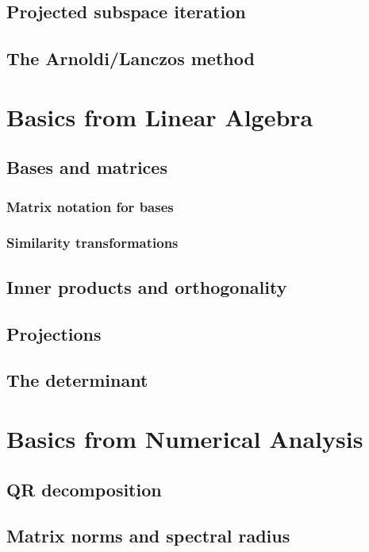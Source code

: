 \section{Projected subspace iteration}


\section{The Arnoldi/Lanczos method}



\appendix
\chapter{Basics from Linear Algebra}
\section{Bases and matrices}
\subsection{Matrix notation for bases}

\subsection{Similarity transformations}

\section{Inner products and orthogonality}

\section{Projections}

\section{The determinant}


\chapter{Basics from Numerical Analysis}

\section{QR decomposition}


\section{Matrix norms and spectral radius}

